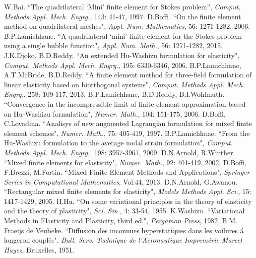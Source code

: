 \documentclass[preprint,12pt,authoryear]{elsarticle}
\begin{document}
\begin{thebibliography}{00}
 W.Bai. 
``The quadrilateral `Mini' finite element for Stokes problem'',
{\it{Comput. Methods Appl. Mech. Engrg.}}, 143: 41-47, 1997.
 D.Boffi. ``On the finite element method on quadrilateral meshes", 
{\it{Appl. Num. Mathematics}}, 56: 1271-1282, 2006.
 B.P.Lamichhane. ``A quadrilateral `mini' finite element for the  Stokes problem using a single bubble function", {\it{Appl. Num. Math.}}, 56: 1271-1282, 2015. 
 J.K.Djoko, B.D.Reddy. ``An extended Hu-Washizu formulation for elasticity", {\it{Comput. Methods Appl. Mech. Engrg.}}, 195: 6330-6346, 2006. 
 B.P.Lamichhane, A.T.McBride, B.D.Reddy. ``A finite element method for three-field formulation of linear elasticity based on biorthogonal systems", 
{\it{Comput. Methods Appl. Mech. Engrg.}}, 258: 109-117, 2013.
 B.P.Lamichhane, B.D.Reddy, B.I.Wohlmuth. ``Convergence in the incompressible limit of finite element approximation based on Hu-Washizu formulation", 
{\it{Numer. Math.}}, 104: 151-175, 2006.
 D.Boffi, C.Lovadina. ``Analisys of new augmented Lagrangian formulation for mixed finite element schemes", 
{\it{Numer. Math.}}, 75: 405-419, 1997.
 B.P.Lamichhane. ``From the Hu-Washizu formulation to the average nodal strain formulation", 
{\it{Comput. Methods Appl. Mech. Engrg.}}, 198: 3957-3961, 2009.
 D.N.Arnold, R.Winther. ``Mixed finite elements for elasticity", 
{\it{Numer. Math.}}, 92: 401-419, 2002.
 D.Boffi, F.Brezzi, M.Fortin. ``Mixed Finite Element Methods and Applications", 
{\it{Springer Series in Computational Mathematics}}, Vol.44, 2013.
 D.N.Arnold, G.Awanou. ``Rectangular mixed finite elements for elasticity", 
{\it{Models Methods Appl. Sci.}}, 15: 1417-1429, 2005.
 H.Hu. ``On some variational principles in the theory of elasticity and the theory of plasticity", 
{\it{Sci. Sin.}}, 4: 33-54, 1955.
 K.Washizu. ``Variational Methods in Elasticity and Plasticity, third ed.", 
{\it{Pergamon Press}}, 1982.
 B.M. Fraeijs de Veubeke. ``Diffusion des inconnues hyperstatiques dans les voilures á longeron couplés", {\it{Bull. Serv. Technique de l’Aeronautique Impremérie Marcel Hayez}}, Bruxelles, 1951.

\end{thebibliography}
\end{document}
